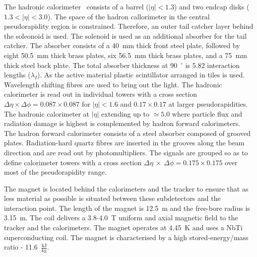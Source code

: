 The hadronic calorimeter~\cite{HCAL_report} consists of a barrel ($\left|\eta\right|<1.3$) and two endcap disks ($1.3<\left|\eta\right|<3.0 $). The space of the hadron callorimeter in the central pseudorapidity region is constrained. Therefore, an outer tail catcher layer behind the soleonoid is used. The solenoid is used as an additional absorber for the tail catcher. The absorber consists of a 40~mm thick front steel plate, followed by eight 50.5~mm thick brass plates, six 56.5~mm thick brass plates, and a 75~mm thick steel back plate. The total absorber thickness at 90~$^{\circ}$ is 5.82 interaction lengths ($\lambda_{I}$). As the active material plastic scintillator arranged in tiles is used. Wavelength shifting fibres are used to bring out the light. The hadronic calorimeter is read out in individual towers with a cross section $\Delta\eta\times\Delta\phi=0.087\times0.087$ for $\left|\eta\right|<1.6$ and $0.17\times0.17$ at larger pseudorapidities. The hadronic calorimeter at  $\left|\eta\right|$ extending up to $\simeq5.0$ where particle flux and radiation damage is highest is complemented by hadron forward calorimeters. The hadron forward calorimeter consists of a steel absorber composed of grooved plates. Radiation-hard quartz fibres are inserted in the grooves along the beam direction and are read out by photomultipliers. The signals are grouped so as to define calorimeter towers with a cross section $\Delta\eta\ \times\ \Delta\phi=0.175\times0.175$ over most of the pseudorapidity range. 

The magnet is located behind the calorimeters and the tracker to ensure that as less material as possible is situated between these subdetectors and the interaction point. The length of the magnet is 12.5~m and the free-bore radius is 3.15~m. The coil delivers a 3.8-4.0~T uniform and axial magnetic field to the tracker and the calorimeters. The magnet operates at 4.45~K and uses a NbTi superconducting coil. The magnet is characterised by a high stored-energy/mass ratio - 11.6~$\frac{\text{kJ}}{\text{kg}}$.

